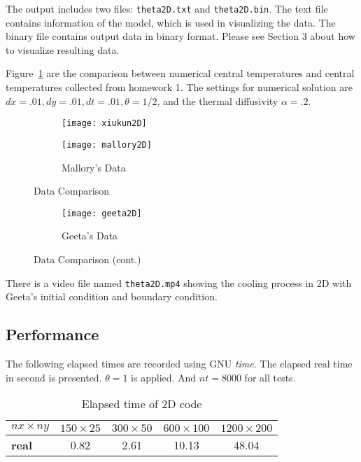 \documentclass[letterpaper,12pt,fleqn]{article}
\begin{document}
The output includes two files: \texttt{theta2D.txt} and \texttt{theta2D.bin}.
The text file contains information of the model, which is used in visualizing the data.
The binary file contains output data in binary format.
Please see Section 3 about how to visualize resulting data.

Figure~\ref{fig:data-comp-2d} are the comparison between numerical central temperatures and central temperatures collected from homework 1.
The settings for numerical solution are $dx=.01, dy=.01, dt=.01, \theta=1/2$, and the thermal diffusivity $\alpha=.2$.

\begin{figure}[H]
  \begin{subfigure}[b]{\textwidth}
    \centering
    \texttt{[image: xiukun2D]}
  \end{subfigure}
  \begin{subfigure}[b]{\textwidth}
    \centering
    \texttt{[image: mallory2D]}
    \caption{Mallory's Data}
  \end{subfigure}
  \caption{Data Comparison}
\end{figure}

\begin{figure}[H]\ContinuedFloat
  \begin{subfigure}[b]{\textwidth}
    \centering
    \texttt{[image: geeta2D]}
    \caption{Geeta's Data}
  \end{subfigure}
  \caption{Data Comparison (cont.)}
  \label{fig:data-comp-2d}
\end{figure}

There is a video file named \texttt{theta2D.mp4} showing the cooling process in 2D with Geeta's initial condition and boundary condition.


\subsection{Performance}
The following elapsed times are recorded using GNU \textit{time}. 
The elapsed real time in second is presented.
$\theta=1$ is applied. And $nt=8000$ for all tests.

\begin{table}[H]
  \centering
  \begin{tabular}{l c c c c }
    \toprule
    \textbf{$nx\times ny$} & $150\times 25$ & $300\times 50$ & $600\times 100$ & $1200\times 200$\\
    \midrule
    \textbf{real} & 0.82 & 2.61 & 10.13 & 48.04\\
    \bottomrule
  \end{tabular}
  \caption{Elapsed time of 2D code}
  \label{tab:time-2d}
\end{table}
\end{document}
